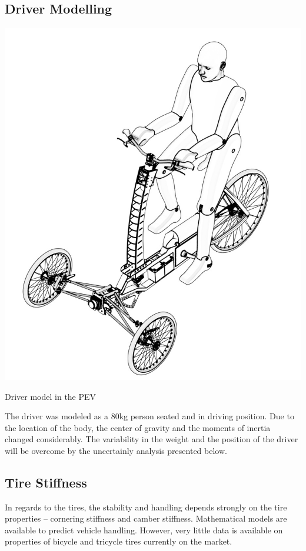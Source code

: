 \subsection{Driver Modelling}

\begin{marginfigure}[5cm]
	\includegraphics[width=1\linewidth]{figs/06/driver}
	\caption{Driver model in the PEV}
\end{marginfigure}
The driver was modeled as a 80kg person seated and in driving position. Due to the location of the body, the center of gravity and the moments of inertia changed considerably. The variability in the weight and the position of the driver will be overcome by the uncertainly analysis presented below.

\subsection{Tire Stiffness}

In regards to the tires, the stability and handling depends strongly on the tire properties -- cornering stiffness and camber stiffness. Mathematical models are available to predict vehicle handling. However, very little data is available on properties of bicycle and tricycle tires currently on the market.

